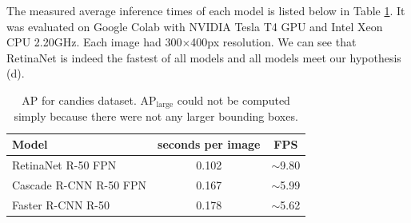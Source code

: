 The measured average inference times of each model is listed below in Table
\ref{tab:candies_time}. It was evaluated on Google Colab with NVIDIA Tesla T4
GPU and Intel Xeon CPU 2.20GHz. Each image had 300$\times$400px resolution. We
can see that RetinaNet is indeed the fastest of all models and all models meet
our hypothesis (d).


\begin{table}[H]
	\centering
	\begin{tabular}{l|c|c}
		Model                  & seconds per image & FPS                               \\
		\hline
		RetinaNet R-50 FPN     & 0.102             & \scriptsize $\sim$\normalsize9.80 \\
		Cascade R-CNN R-50 FPN & 0.167             & \scriptsize $\sim$\normalsize5.99 \\
		Faster R-CNN R-50      & 0.178             & \scriptsize $\sim$\normalsize5.62 \\
	\end{tabular}
	\caption{AP for candies dataset. AP$_\text{large}$ could not be computed
		simply because there were not any larger bounding boxes.}
	\label{tab:candies_time}
\end{table}

